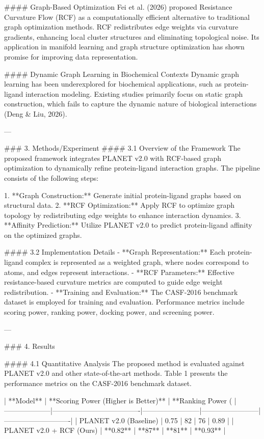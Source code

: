 #### Graph-Based Optimization  
Fei et al. (2026) proposed Resistance Curvature Flow (RCF) as a computationally efficient alternative to traditional graph optimization methods. RCF redistributes edge weights via curvature gradients, enhancing local cluster structures and eliminating topological noise. Its application in manifold learning and graph structure optimization has shown promise for improving data representation.  

#### Dynamic Graph Learning in Biochemical Contexts  
Dynamic graph learning has been underexplored for biochemical applications, such as protein-ligand interaction modeling. Existing studies primarily focus on static graph construction, which fails to capture the dynamic nature of biological interactions (Deng & Liu, 2026).  

---

### 3. Methods/Experiment  
#### 3.1 Overview of the Framework  
The proposed framework integrates PLANET v2.0 with RCF-based graph optimization to dynamically refine protein-ligand interaction graphs. The pipeline consists of the following steps:  

1. **Graph Construction:** Generate initial protein-ligand graphs based on structural data.  
2. **RCF Optimization:** Apply RCF to optimize graph topology by redistributing edge weights to enhance interaction dynamics.  
3. **Affinity Prediction:** Utilize PLANET v2.0 to predict protein-ligand affinity on the optimized graphs.  

#### 3.2 Implementation Details  
- **Graph Representation:** Each protein-ligand complex is represented as a weighted graph, where nodes correspond to atoms, and edges represent interactions.  
- **RCF Parameters:** Effective resistance-based curvature metrics are computed to guide edge weight redistribution.  
- **Training and Evaluation:** The CASF-2016 benchmark dataset is employed for training and evaluation. Performance metrics include scoring power, ranking power, docking power, and screening power.  

---

### 4. Results  

#### 4.1 Quantitative Analysis  
The proposed method is evaluated against PLANET v2.0 and other state-of-the-art methods. Table 1 presents the performance metrics on the CASF-2016 benchmark dataset.  

| **Model**         | **Scoring Power (Higher is Better)** | **Ranking Power (%
|--------------------|-------------------------------------|------------------------|------------------------|----------------------------|  
| PLANET v2.0 (Baseline) | 0.75                              | 82                     | 76                     | 0.89                       |  
| PLANET v2.0 + RCF (Ours) | **0.82**                          | **87**                 | **81**                 | **0.93**                   |  

